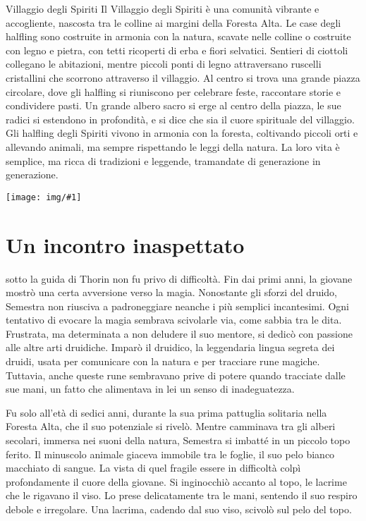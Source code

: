 \documentclass[letterpaper,twocolumn,openany,nodeprecatedcode]{dndbook}
\newcommand{\Cap}[2]{\DndDropCapLine{#1}{#2}}
\newcommand{\imageFull}[3]{%
  \begin{figure*}[#3]
    \begin{tcolorbox}[
        enhanced,
        colframe=PhbTan,
        colback=white,
        opacityback=0,
        title={\vspace{0.2cm}\centering \sc  \textbf{#2}\vspace{0.2cm}},
        colbacktitle=PhbTan!50!PhbLightCyan,
        coltitle=black,
        fonttitle=\bfseries
    ]
    \texttt{[image: img/\#1]}
    \end{tcolorbox}
  \end{figure*}
}
\begin{document}
\begin{DndComment}{Villaggio degli Spiriti}
Il Villaggio degli Spiriti è una comunità vibrante e accogliente, nascosta tra le colline ai margini della Foresta Alta. Le case degli halfling sono costruite in armonia con la natura, scavate nelle colline o costruite con legno e pietra, con tetti ricoperti di erba e fiori selvatici. Sentieri di ciottoli collegano le abitazioni, mentre piccoli ponti di legno attraversano ruscelli cristallini che scorrono attraverso il villaggio. Al centro si trova una grande piazza circolare, dove gli halfling si riuniscono per celebrare feste, raccontare storie e condividere pasti. Un grande albero sacro si erge al centro della piazza, le sue radici si estendono in profondità, e si dice che sia il cuore spirituale del villaggio. Gli halfling degli Spiriti vivono in armonia con la foresta, coltivando piccoli orti e allevando animali, ma sempre rispettando le leggi della natura. La loro vita è semplice, ma ricca di tradizioni e leggende, tramandate di generazione in generazione.
\end{DndComment}
\endgroup

\imageFull{fearun_map.jpg}{Mappa del Faer\"un}{ht}


\section{Un incontro inaspettato}

\Cap{L}{’addestramento di Semestra} sotto la guida di Thorin non fu privo di difficoltà. Fin dai primi anni, la giovane mostrò una certa avversione verso la magia. Nonostante gli sforzi del druido, Semestra non riusciva a padroneggiare neanche i più semplici incantesimi. Ogni tentativo di evocare la magia sembrava scivolarle via, come sabbia tra le dita. Frustrata, ma determinata a non deludere il suo mentore, si dedicò con passione alle altre arti druidiche. Imparò il druidico, la leggendaria lingua segreta dei druidi, usata per comunicare con la natura e per tracciare rune magiche. Tuttavia, anche queste rune sembravano prive di potere quando tracciate dalle sue mani, un fatto che alimentava in lei un senso di inadeguatezza.

Fu solo all’età di sedici anni, durante la sua prima pattuglia solitaria nella Foresta Alta, che il suo potenziale si rivelò. Mentre camminava tra gli alberi secolari, immersa nei suoni della natura, Semestra si imbatté in un piccolo topo ferito. Il minuscolo animale giaceva immobile tra le foglie, il suo pelo bianco macchiato di sangue. La vista di quel fragile essere in difficoltà colpì profondamente il cuore della giovane. Si inginocchiò accanto al topo, le lacrime che le rigavano il viso. Lo prese delicatamente tra le mani, sentendo il suo respiro debole e irregolare. Una lacrima, cadendo dal suo viso, scivolò sul pelo del topo.
\end{document}
